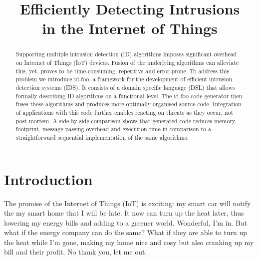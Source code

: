 \documentclass[conference]{IEEEtran}
\begin{document}
\expandafter\def\csname PY@tok@err\endcsname{}

\title{Efficiently Detecting Intrusions\\in the Internet of Things}

\author{%
}

\maketitle

\begin{abstract}

Supporting multiple intrusion detection (ID) algorithms imposes significant
overhead on Internet of Things (IoT) devices. Fusion of the underlying
algorithms can alleviate this, yet, proves to be time-consuming, repetitive and
error-prone. To address this problem we introduce id-foo, a framework for the
development of efficient intrusion detection systems (IDS). It consists of a
domain specific language (DSL) that allows formally describing ID algorithms on
a functional level. The id-foo code generator then fuses these algorithms and
produces more optimally organised source code. Integration of applications with
this code further enables reacting on threats as they occur, not post-mortem. A
side-by-side comparison shows that generated code reduces memory footprint,
message passing overhead and execution time in comparison to a straightforward
sequential implementation of the same algorithms.

\end{abstract}

\section{Introduction}



The promise of the Internet of Things (IoT) is exciting: my smart car will
notify the my smart home \cite{aldrich2003smart} that I will be late. It now
can turn up the heat later, thus lowering my energy bills and adding to a
greener world. Wonderful, I'm in. But what if the energy company can do the
same? What if they are able to turn up the heat while I'm gone, making my home
nice and cosy but also cranking up my bill and their profit. No thank you, let
me out.
\end{document}
